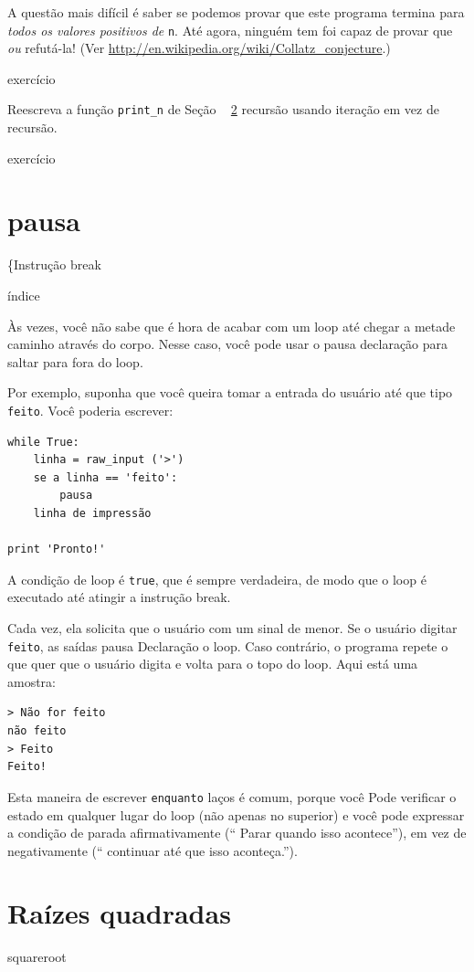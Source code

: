 \documentclass[10pt]{book}
\begin{document}
{{A questão mais difícil é saber se podemos provar que este programa termina
para {\em todos os valores positivos de} {\tt n}. Até agora, ninguém tem
foi capaz de provar que {\em ou} refutá-la! (Ver
  \url{http://en.wikipedia.org/wiki/Collatz_conjecture}.)

\begin{} exercício

Reescreva a função \verb "print_n" de
Seção ~ \ref {} recursão usando iteração em vez de recursão.

\end{} exercício


\section{{pausa \tt}}
\{Instrução break} índice

Às vezes, você não sabe que é hora de acabar com um loop até chegar a metade
caminho através do corpo. Nesse caso, você pode usar o {pausa \tt}
declaração para saltar para fora do loop.

Por exemplo, suponha que você queira tomar a entrada do usuário até que
tipo {\tt feito}. Você poderia escrever:

\begin{verbatim}
while True:
    linha = raw_input ('>')
    se a linha == 'feito':
        pausa
    linha de impressão

print 'Pronto!'
\end{verbatim}
%
A condição de loop é {\tt true}, que é sempre verdadeira, de modo que o
loop é executado até atingir a instrução break.

Cada vez, ela solicita que o usuário com um sinal de menor.
Se o usuário digitar {\tt feito}, as saídas {pausa \tt} Declaração
o loop. Caso contrário, o programa repete o que quer que o usuário digita
e volta para o topo do loop. Aqui está uma amostra:

\begin{verbatim}
> Não for feito
não feito
> Feito
Feito!
\end{verbatim}
%
Esta maneira de escrever {\tt enquanto} laços é comum, porque você
Pode verificar o estado em qualquer lugar do loop (não apenas no
superior) e você pode expressar a condição de parada afirmativamente
(`` Parar quando isso acontece''), em vez de negativamente (`` continuar
até que isso aconteça.'').


\section{Raízes quadradas}
\label{} squareroot

}
\end{document}
